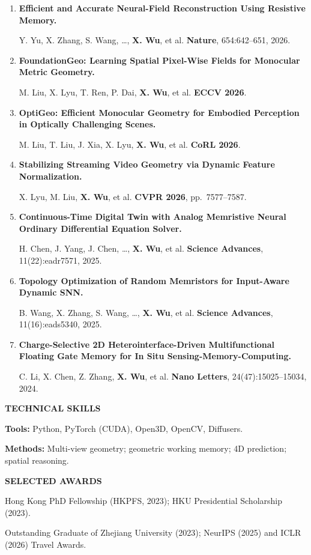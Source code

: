 \documentclass[a4paper]{article}
\newcommand{\cvsection}[1]{%
  \par\vspace{2.0pt}%
  {\color{cvblue}\fontsize{11}{12.2}\selectfont\bfseries\MakeUppercase{#1}}\par
  \vspace{-4pt}{\color{cvblue}\rule{\textwidth}{0.4pt}}\par\vspace{1.0pt}%
}
\newcommand{\pubgroup}[1]{%
  \par\vspace{2.0pt}{\color{cvblue}\fontsize{9.4}{10.4}\selectfont\bfseries #1}\par
}
\begin{document}
{\pubgroup{Collaborative Work}
\begin{enumerate}[resume,leftmargin=1.6em,labelsep=0.38em,itemsep=0.4pt,topsep=1.3pt,parsep=0pt,partopsep=0pt]
\item \textbf{Efficient and Accurate Neural-Field Reconstruction Using Resistive Memory.}\par
Y. Yu, X. Zhang, S. Wang, \ldots, \textbf{X. Wu}, et al. \hfill \textbf{Nature}, 654:642--651, 2026.
\item \textbf{FoundationGeo: Learning Spatial Pixel-Wise Fields for Monocular Metric Geometry.}\par
M. Liu, X. Lyu, T. Ren, P. Dai, \textbf{X. Wu}, et al. \hfill \textbf{ECCV 2026}.
\item \textbf{OptiGeo: Efficient Monocular Geometry for Embodied Perception in Optically Challenging Scenes.}\par
M. Liu, T. Liu, J. Xia, X. Lyu, \textbf{X. Wu}, et al. \hfill \textbf{CoRL 2026}.
\item \textbf{Stabilizing Streaming Video Geometry via Dynamic Feature Normalization.}\par
X. Lyu, M. Liu, \textbf{X. Wu}, et al. \hfill \textbf{CVPR 2026}, pp.\ 7577--7587.
\item \textbf{Continuous-Time Digital Twin with Analog Memristive Neural Ordinary Differential Equation Solver.}\par
H. Chen, J. Yang, J. Chen, \ldots, \textbf{X. Wu}, et al. \hfill \textbf{Science Advances}, 11(22):eadr7571, 2025.
\item \textbf{Topology Optimization of Random Memristors for Input-Aware Dynamic SNN.}\par
B. Wang, X. Zhang, S. Wang, \ldots, \textbf{X. Wu}, et al. \hfill \textbf{Science Advances}, 11(16):eads5340, 2025.
\item \textbf{Charge-Selective 2D Heterointerface-Driven Multifunctional Floating Gate Memory for In Situ Sensing-Memory-Computing.}\par
C. Li, X. Chen, Z. Zhang, \textbf{X. Wu}, et al. \hfill \textbf{Nano Letters}, 24(47):15025--15034, 2024.
\end{enumerate}}

\cvsection{Technical Skills}
\textbf{Tools:} Python, PyTorch (CUDA), Open3D, OpenCV, Diffusers.\par
\textbf{Methods:} Multi-view geometry; geometric working memory; 4D prediction; spatial reasoning.


\cvsection{Selected Awards}
Hong Kong PhD Fellowship (HKPFS, 2023); HKU Presidential Scholarship (2023).\par
Outstanding Graduate of Zhejiang University (2023); NeurIPS (2025) and ICLR (2026) Travel Awards.
\end{document}
